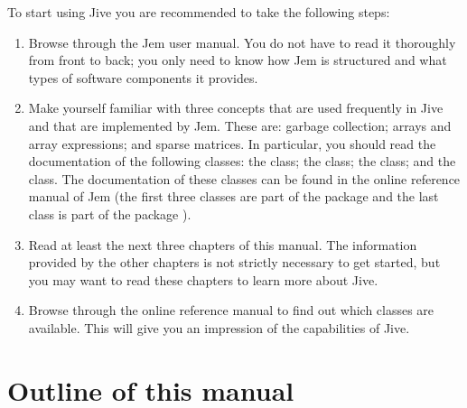 To start using Jive you are recommended to take the following steps:
\begin{enumerate}

\item Browse through the Jem user manual. You do not have to read it
  thoroughly from front to back; you only need to know how Jem is
  structured and what types of software components it provides.

\item Make yourself familiar with three concepts that are used frequently
  in Jive and that are implemented by Jem. These are: garbage collection;
  arrays and array expressions; and sparse matrices. In particular, you
  should read the documentation of the following classes: the
   class; the  class; the 
  class; and the  class. The documentation of these
  classes can be found in the online reference manual of Jem (the first
  three classes are part of the package  and the last class is
  part of the package ).

\item Read at least the next three chapters of this manual. The
  information provided by the other chapters is not strictly necessary to
  get started, but you may want to read these chapters to learn more
  about Jive.

\item Browse through the online reference manual to find out which
  classes are available. This will give you an impression of the
  capabilities of Jive.

\end{enumerate}


\section{Outline of this manual}

\begin{comment}
  This manual is divided into three parts. The first part --
  Chapters~\ref{chapter:the-basics}
  to~\ref{chapter:extended-poisson-solver} -- explains how to start using
  Jive. After discussing some technical aspects of using Jive, it
  presents an elaborate example of a program that computes the solution
  of a simple PDE. The second part -- Chapters~\ref{chapter:utilities}
  to~\ref{chapter:io} -- focuses on the classes and functions
  provided by Jive. The aim of this part is to show which classes and
  functions should be used for which types of operations; to show how the
  classes are related to each other; and to explain why the classes have
  been designed the way they are. The third and last part --
  Chapters~?? to~?? -- discusses various numerical techniques that can be
  used to solve PDEs. It also shows how these techniques can be
  implemented efficiently with Jive.
\end{comment}

